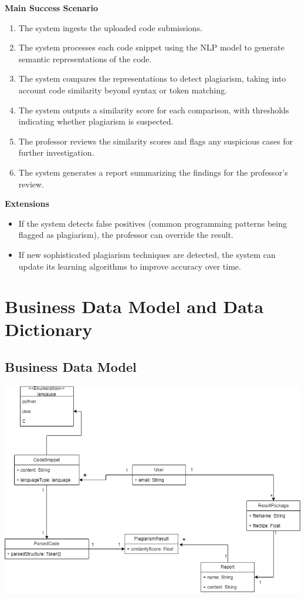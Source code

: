 \documentclass[12pt]{article}
\begin{document}
\textbf{Main Success Scenario}
\begin{enumerate}
    \item The system ingests the uploaded code submissions.
    \item The system processes each code snippet using the NLP model to generate semantic representations of the code.
    \item The system compares the representations to detect plagiarism, taking into account code similarity beyond syntax or token matching.
    \item The system outputs a similarity score for each comparison, with thresholds indicating whether plagiarism is suspected.
    \item The professor reviews the similarity scores and flags any suspicious cases for further investigation.
    \item The system generates a report summarizing the findings for the professor’s review.
\end{enumerate}

\textbf{Extensions}
\begin{itemize}
    \item If the system detects false positives (common programming patterns being flagged as plagiarism), the professor can override the result.
    \item If new sophisticated plagiarism techniques are detected, the system can update its learning algorithms to improve accuracy over time.
\end{itemize}

\section{Business Data Model and Data Dictionary}
\subsection{Business Data Model}
\includegraphics[height=.58\textheight]{./assets/UML.png}
\end{document}
